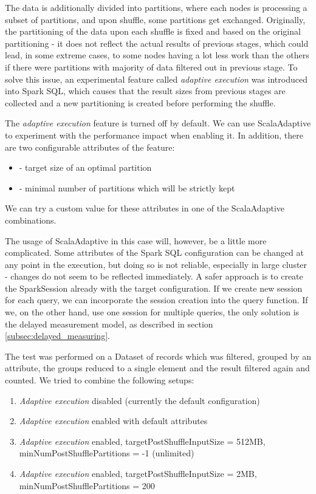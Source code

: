 The data is additionally divided into partitions, where each nodes is processing a subset of partitions, and upon shuffle, some partitions get exchanged. Originally, the partitioning of the data upon each shuffle is fixed and based on the original partitioning - it does not reflect the actual results of previous stages, which could lead, in some extreme cases, to some nodes having a lot less work than the others if there were partitions with majority of data filtered out in previous stage. To solve this issue, an experimental feature called \textit{adaptive execution} was introduced into Spark SQL, which causes that the result sizes from previous stages are collected and a new partitioning is created before performing the shuffle.

The \textit{adaptive execution} feature is turned off by default. We can use ScalaAdaptive to experiment with the performance impact when enabling it. In addition, there are two configurable attributes of the feature:
\begin{itemize}
	\item {} - target size of an optimal partition
	\item {} - minimal number of partitions which will be strictly kept
\end{itemize}
We can try a custom value for these attributes in one of the ScalaAdaptive combinations.

The usage of ScalaAdaptive in this case will, however, be a little more complicated. Some attributes of the Spark SQL configuration can be changed at any point in the execution, but doing so is not reliable, especially in large cluster - changes do not seem to be reflected immediately. A safer approach is to create the SparkSession already with the target configuration. If we create new session for each query, we can incorporate the session creation into the query function. If we, on the other hand, use one session for multiple queries, the only solution is the delayed measurement model, as described in section \ref{subsec:delayed_measuring}. 

The test was performed on a Dataset of records which was filtered, grouped by an attribute, the groups reduced to a single element and the result filtered again and counted. We tried to combine the following setups:

\begin{enumerate}
	\item \textit{Adaptive execution} disabled (currently the default configuration)
	\item \textit{Adaptive execution} enabled with default attributes
	\item \textit{Adaptive execution} enabled, 
	targetPostShuffleInputSize = 512MB, 
	minNumPostShufflePartitions = -1 (unlimited)
	\item \textit{Adaptive execution} enabled, targetPostShuffleInputSize = 2MB, minNumPostShufflePartitions = 200
\end{enumerate}

